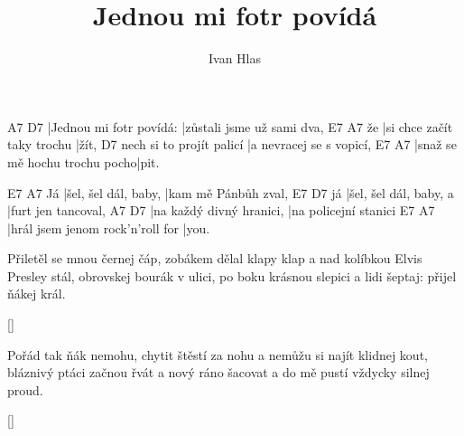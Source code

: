 \documentclass{song}
\title{Jednou mi fotr povídá}
\author{Ivan Hlas}
\begin{document}
\strophe
A7                      D7
|Jednou mi fotr povídá: |zůstali jsme už sami dva,
   E7                         A7
že |si chce začít taky trochu |žít,
                         D7
nech si to projít palicí |a nevracej se s vopicí,
E7                            A7
|snaž se mě hochu trochu pocho|pit.
\endstrophe

   E7                   A7
Já |šel, šel dál, baby, |kam mě Pánbůh zval,
   E7                     D7
já |šel, šel dál, baby, a |furt jen tancoval,
A7                       D7
|na každý divný hranici, |na policejní stanici
E7                               A7
|hrál jsem jenom rock'n'roll for |you.
\endstrophe

\strophe*
Přiletěl se mnou černej čáp, zobákem dělal klapy klap
a nad kolíbkou Elvis Presley stál,
obrovskej bourák v ulici, po boku krásnou slepici
a lidi šeptaj: přijel ňákej král.
\endstrophe

\ref{}

\strophe*
Pořád tak ňák nemohu, chytit štěstí za nohu
a nemůžu si najít klidnej kout,
bláznivý ptáci začnou řvát a nový ráno šacovat
a do mě pustí vždycky silnej proud.
\endstrophe

\ref{}
\end{document}
